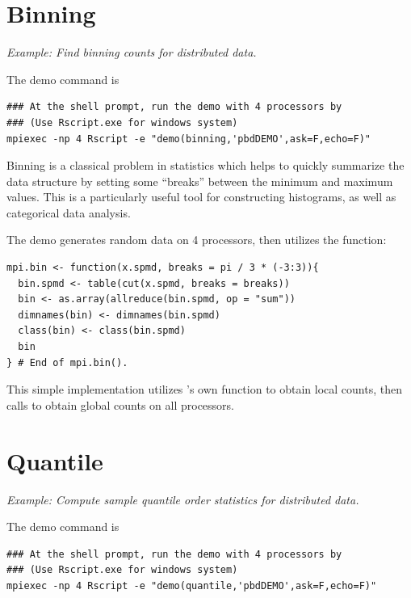 \section[Binning]{Binning}%
\label{sec:binning}

\emph{Example:  Find binning counts for distributed data.}

The demo command is
\begin{lstlisting}
### At the shell prompt, run the demo with 4 processors by
### (Use Rscript.exe for windows system)
mpiexec -np 4 Rscript -e "demo(binning,'pbdDEMO',ask=F,echo=F)"
\end{lstlisting}

Binning is a classical problem in statistics which helps to quickly summarize
the data structure by setting some ``breaks'' between the minimum and maximum
values.
This is a particularly useful tool for constructing histograms, as well as
categorical data analysis.

The demo generates random data on 4 processors, then
utilizes the  function:
\begin{lstlisting}[language=rr,title=R Code]
mpi.bin <- function(x.spmd, breaks = pi / 3 * (-3:3)){
  bin.spmd <- table(cut(x.spmd, breaks = breaks))
  bin <- as.array(allreduce(bin.spmd, op = "sum"))
  dimnames(bin) <- dimnames(bin.spmd)
  class(bin) <- class(bin.spmd)
  bin
} # End of mpi.bin().
\end{lstlisting}
This simple implementation utilizes 's own 
function to obtain local counts, then calls
to obtain global counts on all processors.






\section[Quantile]{Quantile}%
\label{sec:quantile}

\emph{Example:  Compute sample quantile order statistics for distributed data.}

The demo command is
\begin{lstlisting}
### At the shell prompt, run the demo with 4 processors by
### (Use Rscript.exe for windows system)
mpiexec -np 4 Rscript -e "demo(quantile,'pbdDEMO',ask=F,echo=F)"
\end{lstlisting}


